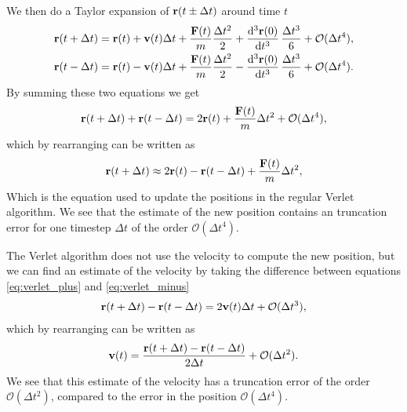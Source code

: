 We then do a Taylor expansion of $\mathbf{r}(t \pm \Delta t)$ around time $t$
\begin{align}
    \rvec(t + \Delta t) &= \rvec(t) + \vvec(t)\Delta t + \frac{\Fvec(t)}{m}\frac{\Delta t^2}{2} + \dod[3]{\rvec(0)}{t}\frac{\Delta t^3}{6} + \mathcal{O}(\Delta t^4), \label{eq:verlet_plus}\\
    \rvec(t - \Delta t) &= \rvec(t) - \vvec(t)\Delta t + \frac{\Fvec(t)}{m}\frac{\Delta t^2}{2} - \dod[3]{\rvec(0)}{t}\frac{\Delta t^3}{6} + \mathcal{O}(\Delta t^4).\label{eq:verlet_minus}
\end{align}
By summing these two equations we get
\begin{align*}
    \mathbf{r}(t + \Delta t) + \mathbf{r}(t - \Delta t) = 2\mathbf{r}(t) + \frac{\mathbf{F}(t)}{m}\Delta t^2 + \mathcal{O}(\Delta t^4),
\end{align*}
which by rearranging can be written as
\begin{align*}
    \mathbf{r}(t + \Delta t) \approx 2\mathbf{r}(t) - \mathbf{r}(t - \Delta t) + \frac{\mathbf{F}(t)}{m}\Delta t^2,
\end{align*}
Which is the equation used to update the positions in the regular Verlet algorithm. We see that the estimate of the new position contains an truncation error for one timestep $\Delta t$ of the order $\mathcal{O}(\Delta t^4)$.

The Verlet algorithm does not use the velocity to compute the new position, but we can find an estimate of the velocity by taking the difference between equations \eqref{eq:verlet_plus} and \eqref{eq:verlet_minus}
\begin{align*}
    \mathbf{r}(t + \Delta t) - \mathbf{r}(t - \Delta t) = 2\mathbf{v}(t)\Delta t + \mathcal{O}(\Delta t^3),
\end{align*}
which by rearranging can be written as
\begin{align*}
    \mathbf{v}(t) = \frac{\mathbf{r}(t + \Delta t) - \mathbf{r}(t - \Delta t)}{2\Delta t} + \mathcal{O}(\Delta t^2).
\end{align*}
We see that this estimate of the velocity has a truncation error of the order $\mathcal{O}(\Delta t^2)$, compared to the error in the position $\mathcal{O}(\Delta t^4)$.


